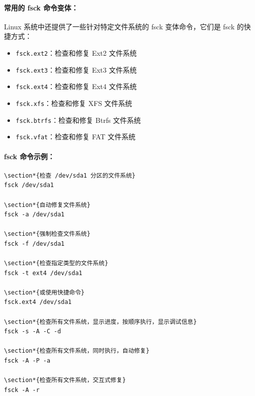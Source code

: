 \documentclass[12pt,UTF8]{ctexbook}
\begin{document}
\paragraph{常用的 fsck 命令变体：}
Linux 系统中还提供了一些针对特定文件系统的 fsck 变体命令，它们是 fsck 的快捷方式：
\begin{itemize}
    \item \verb+fsck.ext2+：检查和修复 Ext2 文件系统
    \item \verb+fsck.ext3+：检查和修复 Ext3 文件系统
    \item \verb+fsck.ext4+：检查和修复 Ext4 文件系统
    \item \verb+fsck.xfs+：检查和修复 XFS 文件系统
    \item \verb+fsck.btrfs+：检查和修复 Btrfs 文件系统
    \item \verb+fsck.vfat+：检查和修复 FAT 文件系统
\end{itemize}

\paragraph{fsck 命令示例：}
\begin{verbatim}
\section*{检查 /dev/sda1 分区的文件系统}
fsck /dev/sda1

\section*{自动修复文件系统}
fsck -a /dev/sda1

\section*{强制检查文件系统}
fsck -f /dev/sda1

\section*{检查指定类型的文件系统}
fsck -t ext4 /dev/sda1

\section*{或使用快捷命令}
fsck.ext4 /dev/sda1

\section*{检查所有文件系统，显示进度，按顺序执行，显示调试信息}
fsck -s -A -C -d

\section*{检查所有文件系统，同时执行，自动修复}
fsck -A -P -a

\section*{检查所有文件系统，交互式修复}
fsck -A -r
\end{verbatim}
\end{document}
